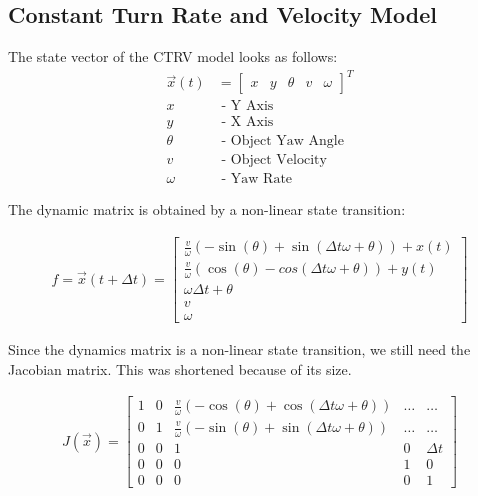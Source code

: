 \documentclass[11pt,oneside,openright]{mpreport}
\begin{document}
\subsection{Constant Turn Rate and Velocity Model}
The state vector \cite{Schubert2008} of the CTRV model looks as follows:
\begin{align*}
\vec{x}(t) &=
\begin{bmatrix}
x & y & \theta & v & \omega
\end{bmatrix}^T\\
x &\text{ - Y Axis}\\
y &\text{ - X Axis}\\
\theta &\text{ - Object Yaw Angle}\\
v &\text{ - Object Velocity}\\
\omega &\text{ - Yaw Rate}
\end{align*}

The dynamic matrix is obtained by a non-linear state transition:

\begin{align*}
f = \vec{x}(t + \Delta t)=
\begin{bmatrix}
\frac{v}{\omega} (-\sin(\theta) + \sin(\Delta t \omega + \theta)) + x(t) \\
\frac{v}{\omega} (\cos(\theta) - cos(\Delta t \omega + \theta)) + y(t) \\
\omega \Delta t + \theta\\
v\\
\omega
\end{bmatrix} 
\end{align*}

Since the dynamics matrix is a non-linear state transition, we still need the Jacobian matrix. This was shortened because of its size.
 
 
\begin{align*}
J(\vec{x})=
\begin{bmatrix}
1 & 0 & \frac{v}{\omega} (-\cos(\theta) + \cos(\Delta t \omega + \theta))& \dots & \dots \\
0 & 1 & \frac{v}{\omega} (-\sin(\theta) + \sin(\Delta t \omega + \theta))& \dots & \dots \\
0 & 0 & 1 & 0 & \Delta t\\
0 & 0 & 0 & 1 & 0\\
0 & 0 & 0 & 0 & 1
\end{bmatrix} 
\end{align*}
\end{document}
